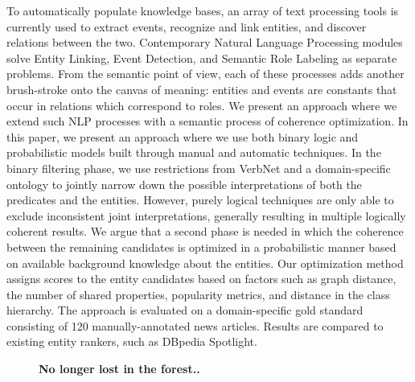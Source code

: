\documentclass[10pt, a4paper, twopage, headinclude, footinclude, BCOR5mm]{book}
\begin{document}
To automatically populate knowledge bases, an array of text processing tools is currently used to extract events, recognize and link entities, and discover relations between the two. Contemporary Natural Language Processing modules solve Entity Linking, Event Detection, and Semantic Role Labeling as separate problems. From the semantic point of view, each of these processes adds another brush-stroke onto the canvas of meaning: entities and events are constants that occur in relations which correspond to roles. We present an approach where we extend such NLP processes with a semantic process of coherence optimization.  In this paper, we present an approach where we use both binary logic and probabilistic models built through manual and automatic techniques. In the binary filtering phase, we use restrictions from VerbNet and a domain-specific ontology to jointly narrow down the possible interpretations of both the predicates and the entities. However, purely logical techniques are only able to exclude inconsistent joint interpretations, generally resulting in multiple logically coherent results. We argue that a second phase is needed in which the coherence between the remaining candidates is optimized in a probabilistic manner based on available background knowledge about the entities. Our optimization method assigns scores to the entity candidates based on factors such as graph distance, the number of shared properties, popularity metrics, and distance in the class hierarchy.  The approach is evaluated on a domain-specific gold standard consisting of 120 manually-annotated news articles. Results are compared to existing entity rankers, such as DBpedia Spotlight.  

\newpage

\begin{figure}[t!]
\centering
\large\textbf{No longer lost in the forest..}
\vspace*{0.5cm}
\end{figure}
\end{document}
